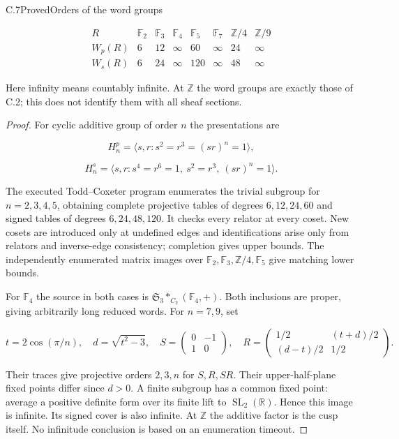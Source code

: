 \begin{statement}{C.7}{Proved}{Orders of the word groups}

$$
\begin{array}{c|rrrrrrr}
R&\mathbb F_2&\mathbb F_3&\mathbb F_4&\mathbb F_5&\mathbb F_7&
\mathbb Z/4&\mathbb Z/9\\\hline
W_p(R)&6&12&\infty&60&\infty&24&\infty\\
W_s(R)&6&24&\infty&120&\infty&48&\infty
\end{array}
$$

Here infinity means countably infinite.
At $\mathbb Z$ the word groups are exactly those of C.2;
this does not identify them with all sheaf sections.
\end{statement}
\begin{proof}
For cyclic additive group of order $n$ the presentations are

$$
H_n^p=\langle s,r:s^2=r^3=(sr)^n=1\rangle,
$$


$$
H_n^s=\langle s,r:s^4=r^6=1,\ s^2=r^3,\ (sr)^n=1\rangle.
$$

The executed Todd--Coxeter program enumerates the trivial
subgroup for $n=2,3,4,5$, obtaining complete projective tables
of degrees $6,12,24,60$ and signed tables of degrees
$6,24,48,120$. It checks every relator at every coset.
New cosets are introduced only at undefined edges and
identifications arise only from relators and inverse-edge
consistency; completion gives upper bounds.
The independently enumerated matrix images over
$\mathbb F_2,\mathbb F_3,\mathbb Z/4,\mathbb F_5$
give matching lower bounds.

For $\mathbb F_4$ the source in both cases is
$\mathfrak S_3*_{C_2}(\mathbb F_4,+)$.
Both inclusions are proper, giving arbitrarily long reduced words.
For $n=7,9$, set

$$
t=2\cos(\pi/n),\quad d=\sqrt{t^2-3},\quad
 S=\begin{pmatrix}0&-1\\1&0\end{pmatrix},\quad
 R=\begin{pmatrix}1/2&(t+d)/2\\(d-t)/2&1/2\end{pmatrix}.
$$

Their traces give projective orders $2,3,n$ for $S,R,SR$.
Their upper-half-plane fixed points differ since $d>0$.
A finite subgroup has a common fixed point: average a positive
definite form over its finite lift to $\operatorname{SL}_2(\mathbb R)$.
Hence this image is infinite. Its signed cover is also infinite.
At $\mathbb Z$ the additive factor is the cusp itself.
No infinitude conclusion is based on an enumeration timeout.
\end{proof}

